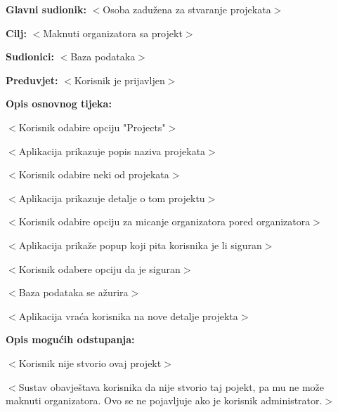 					\noindent {}
					\begin{packed_item}

						\item \textbf{Glavni sudionik:} $<$Osoba zadužena za stvaranje projekata$>$
						\item \textbf{Cilj:} $<$Maknuti organizatora sa projekt$>$
						\item \textbf{Sudionici:} $<$Baza podataka$>$
						\item \textbf{Preduvjet:} $<$Korisnik je prijavljen$>$
						\item \textbf{Opis osnovnog tijeka:}

						\item[] \begin{packed_enum}

							\item $<$Korisnik odabire opciju "Projects"$>$
							\item $<$Aplikacija prikazuje popis naziva projekata$>$
							\item $<$Korisnik odabire neki od projekata$>$
							\item $<$Aplikacija prikazuje detalje o tom projektu$>$
							\item $<$Korisnik odabire opciju za micanje organizatora pored organizatora$>$
							\item $<$Aplikacija prikaže popup koji pita korisnika je li siguran$>$
							\item $<$Korisnik odabere opciju da je siguran$>$
							\item $<$Baza podataka se ažurira$>$
							\item $<$Aplikacija vraća korisnika na nove detalje projekta$>$
						\end{packed_enum}

						\item \textbf{Opis mogućih odstupanja:}

						\item[] \begin{packed_item}

							\item[7.a] $<$Korisnik nije stvorio ovaj projekt$>$
							\item[] \begin{packed_enum}

								\item $<$Sustav obavještava korisnika da nije stvorio taj pojekt, pa mu ne može maknuti organizatora.
								Ovo se ne pojavljuje ako je korisnik administrator.$>$

							\end{packed_enum}

						\end{packed_item}
					\end{packed_item}

